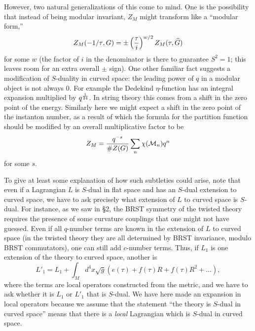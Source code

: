 \documentclass[12pt]{article}
\numberwithin{equation}{section}
\begin{document}
However, two natural generalizations of this come to mind.
One is the possibility that instead of being modular invariant,
$Z_M$ might transform like a ``modular form,''
%
\begin{equation}
  \label{dsdu}
  Z_M({-1/\tau},G) =\pm \left({\tau \over i}\right)^{w/2} Z_M(\tau,{\widehat G})
\end{equation} %
for some $w$ (the factor of $i$ in the denominator
  is there to guarantee $S^2=1$; this leaves room for an extra overall
$\pm$ sign).
One other familiar fact suggests a modification
of $S$-duality in curved space:
the leading power of $q$ in a modular object
is not always 0.  For example the Dedekind
$\eta$-function has an integral expansion multiplied
by $q^{1\over 24}$.  In string theory this comes from a shift in
the zero point of the energy.
Similarly here we might expect a shift in the zero point of the instanton
number, as a result of which
the formula for the partition function should
be modified by an overall multiplicative factor to be
\begin{equation}
  \label{inssum}
  Z_M={q^{-s}\over \#Z(G)}\sum_n\chi({\cal M}_n) q^n
\end{equation}
for some $s$.

To give at least some explanation of how such subtleties
could arise, note that
even if a Lagrangian $L$ is $S$-dual in flat space and has an $S$-dual
extension to curved space, we have to ask
precisely what extension of $L$ to curved space is $S$-dual.
For instance, as we saw in \S2, the BRST symmetry of the twisted
theory requires the presence of some curvature couplings that one might
not have guessed.  Even if all $q$-number terms are known in the extension
of $L$ to curved space (in the twisted theory they are all determined
by BRST invariance, modulo BRST commutators), one can still add $c$-number
terms.  Thus, if $L_1$ is one extension of the theory to curved space,
another is
\begin{equation}
  \label{lonep}
  L'{}_1=L_1+\int_Md^4x \sqrt g\left(e(\tau) +f(\tau)R +f(\tau)R^2+\dots\right),
\end{equation}
where the terms are local operators constructed from the metric,
and we have to ask whether it is $L_1$ or $L'{}_1$ that is $S$-dual.
We have here made an expansion in local
operators because we assume that the statement ``the theory is $S$-dual
in curved space'' means that there is a {\it local} Lagrangian which
is $S$-dual in curved space.
\end{document}
